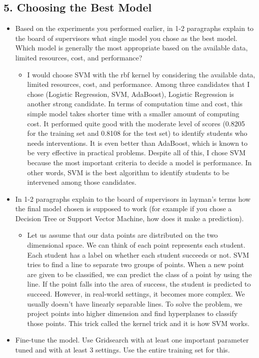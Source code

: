 \documentclass{article}
\providecommand{\tightlist}{%
      \setlength{\itemsep}{0pt}\setlength{\parskip}{0pt}}
\begin{document}
    \subsection{5. Choosing the Best Model}\label{choosing-the-best-model}

\begin{itemize}
\item
  Based on the experiments you performed earlier, in 1-2 paragraphs
  explain to the board of supervisors what single model you chose as the
  best model. Which model is generally the most appropriate based on the
  available data, limited resources, cost, and performance?

  \begin{itemize}
  \tightlist
  \item
    I would choose SVM with the rbf kernel by considering the available
    data, limited resources, cost, and performance. Among three
    candidates that I chose (Logistic Regression, SVM, AdaBoost),
    Logistic Regression is another strong candidate. In terms of
    computation time and cost, this simple model takes shorter time with
    a smaller amount of computing cost. It performed quite good with the
    moderate level of scores (0.8205 for the training set and 0.8108 for
    the test set) to identify students who needs interventions. It is
    even better than AdaBoost, which is known to be very effective in
    practical problems. Despite all of this, I chose SVM because the
    most important criteria to decide a model is performance. In other
    words, SVM is the best algorithm to identify students to be
    intervened among those candidates.
  \end{itemize}
\item
  In 1-2 paragraphs explain to the board of supervisors in layman's
  terms how the final model chosen is supposed to work (for example if
  you chose a Decision Tree or Support Vector Machine, how does it make
  a prediction).

  \begin{itemize}
  \tightlist
  \item
    Let us assume that our data points are distributed on the two
    dimensional space. We can think of each point represents each
    student. Each student has a label on whether each student succeeds
    or not. SVM tries to find a line to separate two groups of points.
    When a new point are given to be classified, we can predict the
    class of a point by using the line. If the point falls into the area
    of success, the student is predicted to succeed. However, in
    real-world settings, it becomes more complex. We usually doesn't
    have linearly separable lines. To solve the problem, we project
    points into higher dimension and find hyperplanes to classify those
    points. This trick called the kernel trick and it is how SVM works.
  \end{itemize}
\item
  Fine-tune the model. Use Gridsearch with at least one important
  parameter tuned and with at least 3 settings. Use the entire training
  set for this.
\end{itemize}
\end{document}
